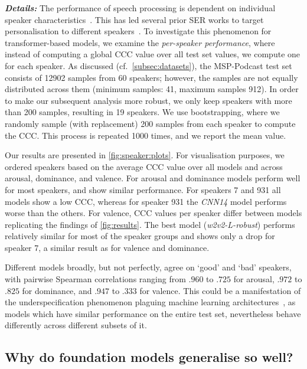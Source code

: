 \documentclass{article}
\newcommand\cnn{\mbox{\emph{CNN14}}}
\newcommand\wrobust{\mbox{\emph{w2v2-L-robust}}}
\newcommand\msppodcast{\mbox{MSP-Podcast}}
\newcommand{\cf}{{cf.\ }}
\begin{document}
\noindent
\emph{\textbf{Details:}}
The performance of speech processing is dependent on individual speaker characteristics~\citep{doddington1998sheep}.
This has led several prior \ac{SER} works to target personalisation to different speakers~\citep{rudovic2018personalized, triantafyllopoulos2021deep, sridhar2022unsupervised}.
To investigate this phenomenon for transformer-based models, we examine the \emph{per-speaker performance}, where instead of computing a global \ac{CCC} value over all test set values, we compute one for each speaker.
As discussed (\cf \cref{subsec:datasets}), the {\msppodcast} test set consists of 12902 samples from 60 speakers; however, the samples are not equally distributed across them (minimum samples: 41, maximum samples 912).
In order to make our subsequent analysis more robust, we only keep speakers with more than 200 samples, resulting in 19 speakers.
We use bootstrapping, where we randomly sample (with replacement) 200 samples from each speaker to compute the \ac{CCC}.
This process is repeated 1000 times, and we report the mean value.

Our results are presented in \cref{fig:speaker:plots}.
For visualisation purposes, we ordered speakers based on the average \ac{CCC} value over all models and across arousal, dominance, and valence.
For arousal and dominance models perform well for most speakers,
and show similar performance.
For speakers 7 and 931 all models show a low CCC, whereas for speaker 931 the {\cnn} model performs worse than the others.
For valence, CCC values per speaker differ between models
replicating the findings of \cref{fig:results}.
The best model ({\wrobust}) performs relatively similar for most of the speaker groups and shows only a drop for speaker 7, a similar result as for valence and dominance.

Different models broadly, but not perfectly, agree on `good' and `bad' speakers, with pairwise Spearman correlations ranging from $.960$ to $.725$ for arousal, $.972$ to $.825$ for dominance, and $.947$ to $.333$ for valence.
This could be a manifestation of the underspecification phenomenon plaguing machine learning architectures~\citep{d2020underspecification}, as models which have similar performance on the entire test set, nevertheless behave differently across different subsets of it.





\subsection{Why do foundation models generalise so well?}
\label{subsec:tsne}
\end{document}
